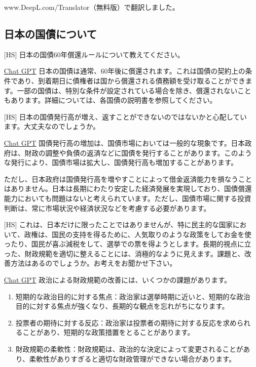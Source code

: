 \documentclass[
]{bxjsbook}
\providecommand{\tightlist}{%
  \setlength{\itemsep}{0pt}\setlength{\parskip}{0pt}}
\theoremstyle{definition}
\theoremstyle{definition}
\theoremstyle{definition}
\theoremstyle{definition}
\theoremstyle{remark}
\begin{document}
www.DeepL.com/Translator（無料版）で翻訳しました。

\hypertarget{nationalbond}{%
\subsection{日本の国債について　}\label{nationalbond}}

{[}HS{]} 日本の国債60年償還ルールについて教えてください。

\protect\hyperlink{chatgpt}{Chat GPT} 日本の国債は通常、60年後に償還されます。これは国債の契約上の条件であり、到着期日に債権者は国から償還される債務額を受け取ることができます。一部の国債は、特別な条件が設定されている場合を除き、償還されないこともあります。詳細については、各国債の説明書を参照してください。

{[}HS{]} 日本の国債発行高が増え、返すことができないのではないかと心配しています。大丈夫なのでしょうか。

\protect\hyperlink{chatgpt}{Chat GPT} 国債発行高の増加は、国債市場においては一般的な現象です。日本政府は、財政の調整や負債の返済などに国債を発行することがあります。このような発行により、国債市場は拡大し、国債発行高も増加することがあります。

ただし、日本政府は国債発行高を増やすことによって借金返済能力を損なうことはありません。日本は長期にわたり安定した経済発展を実現しており、国債償還能力においても問題はないと考えられています。ただし、国債市場に関する投資判断は、常に市場状況や経済状況などを考慮する必要があります。

{[}HS{]} これは、日本だけに限ったことではありませんが、特に民主的な国家において、政権は、国民の支持を得るために、人気取りのような政策をしてお金を使ったり、国民が喜ぶ減税をして、選挙での票を得ようとします。長期的視点に立った、財政規範を適切に整えることには、消極的なように見えます。課題と、改善方法はあるのでしょうか。お考えをお聞かせ下さい。

\protect\hyperlink{chatgpt}{Chat GPT} 政治による財政規範の改善には、いくつかの課題があります。

\begin{enumerate}
\def\labelenumi{\arabic{enumi}.}
\tightlist
\item
  短期的な政治目的に対する焦点：政治家は選挙時期に近いと、短期的な政治目的に対する焦点が強くなり、長期的な観点を忘れがちになります。
\item
  投票者の期待に対する反応：政治家は投票者の期待に対する反応を求められることがあり、短期的な政策措置をとることがあります。
\item
  財政規範の柔軟性：財政規範は、政治的な決定によって変更されることがあり、柔軟性がありすぎると適切な財政管理ができない場合があります。
\end{enumerate}
\end{document}
